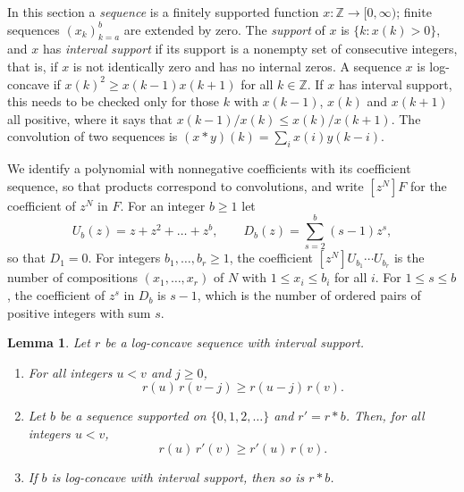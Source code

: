 \documentclass{amsart}
\newtheorem{lemma}[theorem]{Lemma}
\theoremstyle{definition}
\theoremstyle{remark}
\numberwithin{equation}{section}
\newcommand{\Z}{\mathbb{Z}}
\newcommand{\coef}[1]{[z^{#1}]}
\begin{document}
In this section a \emph{sequence} is a finitely supported function $x\colon\Z\to[0,\infty)$; finite sequences $(x_k)_{k=a}^{b}$ are extended by zero. The \emph{support} of $x$ is $\{k:x(k)>0\}$, and $x$ has \emph{interval support} if its support is a nonempty set of consecutive integers, that is, if $x$ is not identically zero and has no internal zeros. A sequence $x$ is log-concave if $x(k)^2\ge x(k-1)x(k+1)$ for all $k\in\Z$. If $x$ has interval support, this needs to be checked only for those $k$ with $x(k-1)$, $x(k)$ and $x(k+1)$ all positive, where it says that $x(k-1)/x(k)\le x(k)/x(k+1)$. The convolution of two sequences is $(x*y)(k)=\sum_i x(i)y(k-i)$.

We identify a polynomial with nonnegative coefficients with its coefficient sequence, so that products correspond to convolutions, and write $\coef{N}F$ for the coefficient of $z^N$ in $F$. For an integer $b\ge1$ let
\[
U_b(z)=z+z^2+\dots+z^b,\qquad D_b(z)=\sum_{s=2}^{b}(s-1)z^s,
\]
so that $D_1=0$. For integers $b_1,\dots,b_r\ge1$, the coefficient $\coef{N}U_{b_1}\cdots U_{b_r}$ is the number of compositions $(x_1,\dots,x_r)$ of $N$ with $1\le x_i\le b_i$ for all $i$. For $1\le s\le b$, the coefficient of $z^s$ in $D_b$ is $s-1$, which is the number of ordered pairs of positive integers with sum $s$.

\begin{lemma}\label{lem:lc}
Let $r$ be a log-concave sequence with interval support.
\begin{enumerate}
\item For all integers $u<v$ and $j\ge0$,
\begin{equation}\label{eq:window}
r(u)\,r(v-j)\ge r(u-j)\,r(v).
\end{equation}
\item Let $b$ be a sequence supported on $\{0,1,2,\dots\}$ and $r'=r*b$. Then, for all integers $u<v$,
\begin{equation}\label{eq:shift}
r(u)\,r'(v)\ge r'(u)\,r(v).
\end{equation}
\item If $b$ is log-concave with interval support, then so is $r*b$.
\end{enumerate}
\end{lemma}
\end{document}
